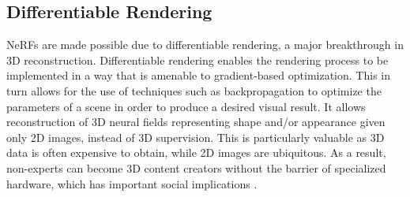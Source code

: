
\subsection{Differentiable Rendering} 
NeRFs are made possible due to differentiable rendering, a major breakthrough in 3D reconstruction. Differentiable rendering enables the rendering process to be implemented in a way that is amenable to gradient-based optimization. This in turn allows for the use of techniques such as backpropagation to optimize the parameters of a scene in order to produce a desired visual result. It allows reconstruction of 3D neural fields representing shape and/or appearance given only 2D images, instead of 3D supervision. This is particularly valuable as 3D data is often expensive to obtain, while 2D images are ubiquitous. As a result, non-experts can become 3D content creators without the barrier of specialized hardware, which has important social implications \cite{xie_neural_2022}.





